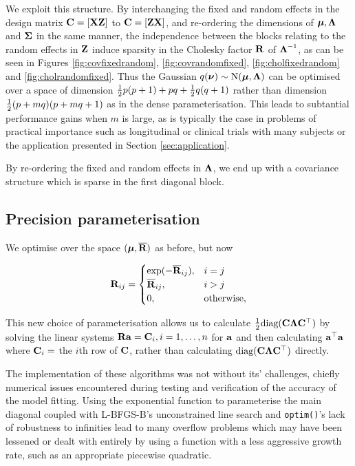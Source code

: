 \documentclass{amsart}[12pt]
\begin{document}
			\noindent We exploit this structure. By interchanging the fixed and random effects in the design matrix ${\bf C} = [{\bf X} {\bf Z}]$ to ${\bf C} = [{\bf Z} {\bf X}]$, and re-ordering the dimensions of ${\boldsymbol \mu}, {\boldsymbol \Lambda}$ and ${\boldsymbol \Sigma}$ in the same manner, the independence between the
			blocks relating to the random effects in ${\bf Z}$ induce sparsity in the Cholesky factor ${\bf R}$ of
			${\boldsymbol \Lambda}^{-1}$, as can be seen in Figures \ref{fig:covfixedrandom}, \ref{fig:covrandomfixed},
			\ref{fig:cholfixedrandom} and \ref{fig:cholrandomfixed}. Thus the Gaussian $q({\boldsymbol \nu}) \sim \text{N}({\boldsymbol \mu}, {\boldsymbol \Lambda})$ can be optimised over a space of dimension $\tfrac{1}{2} p (p + 1) + pq + \tfrac{1}{2} q (q + 1)$ rather than dimension
			$\tfrac{1}{2} (p + mq) (p + mq + 1)$ as in the dense parameterisation. This leads to subtantial performance gains
			when $m$ is large, as is typically the case in problems of practical importance such as longitudinal or 
			clinical trials with many subjects or the application presented in Section \ref{sec:application}.
					
			By re-ordering the fixed and random effects in ${\boldsymbol \Lambda}$, we end up with a covariance structure which is 
			sparse in the first diagonal block.
			
			\subsection{Precision parameterisation}
			
			We optimise over the space $({\boldsymbol \mu}, \overline{{\bf R}})$ as before, but now 
					
			\begin{equation*}
				{\bf R}_{ij} =
				\begin{cases}
					\exp(-\overline{{\bf R}}_{ij}), & i = j             \\
					\overline{{\bf R}}_{ij},        & i > j             \\
					0,                          & \text{otherwise}, 
				\end{cases}
			\end{equation*}
				
			\noindent This new choice of parameterisation allows us to calculate $\tfrac{1}{2} \text{diag}({\bf C} {\boldsymbol \Lambda}
			{\bf C}^\top)$ by solving the linear systems ${\bf R} {\bf a} = {\bf C}_{i}, i=1, \ldots, n$ for   ${\bf a}$ and then calculating
			${\bf a}^\top{\bf a}$ where ${\bf C}_{i} = $ the $i$th row of ${\bf C}$, rather than calculating $\text{diag}({\bf C} {\boldsymbol \Lambda}
			{\bf C}^\top)$ directly.
				
			The implementation of these algorithms was not without its' challenges, chiefly numerical issues encountered during testing and verification of the accuracy of the model fitting. Using the exponential function to parameterise the main diagonal coupled with L-BFGS-B's unconstrained line search and \texttt{optim()}'s lack of robustness to infinities lead to many overflow problems which may have been lessened or dealt with entirely by using a function with a less aggressive growth rate, such as an appropriate piecewise quadratic.
				
\end{document}
